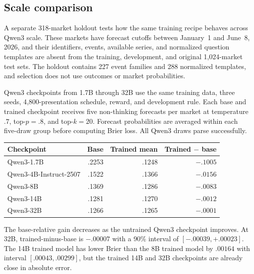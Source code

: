 \subsection{Scale comparison}
\label{app:exp4-scale}

A separate 318-market holdout tests how the same training recipe behaves across Qwen3 scale.
These markets have forecast cutoffs between January~1 and June~8, 2026, and their identifiers, events, available series, and normalized question templates are absent from the training, development, and original 1,024-market test sets.
The holdout contains 227 event families and 288 normalized templates, and selection does not use outcomes or market probabilities.

Qwen3 checkpoints from 1.7B through 32B use the same training data, three seeds, 4,800-presentation schedule, reward, and development rule.
Each base and trained checkpoint receives five non-thinking forecasts per market at temperature $.7$, top-\(p=.8\), and top-\(k=20\).
Forecast probabilities are averaged within each five-draw group before computing Brier loss.
All Qwen3 draws parse successfully.

\begin{center}
\begin{minipage}{0.82\linewidth}
\centering
{}
\label{tab:exp4-qwen-scale-results}
\small
\begin{tabular}{lrrr}
\toprule
Checkpoint & Base & Trained mean & Trained \(-\) base \\
\midrule
Qwen3-1.7B & .2253 & .1248 & $-.1005$ \\
Qwen3-4B-Instruct-2507 & .1522 & .1366 & $-.0156$ \\
Qwen3-8B & .1369 & .1286 & $-.0083$ \\
Qwen3-14B & .1281 & .1270 & $-.0012$ \\
Qwen3-32B & .1266 & .1265 & $-.0001$ \\
\bottomrule
\end{tabular}
\end{minipage}
\end{center}

The base-relative gain decreases as the untrained Qwen3 checkpoint improves.
At 32B, trained-minus-base is \(-.00007\) with a 90\% interval of \([-.00039,+.00023]\).
The 14B trained model has lower Brier than the 8B trained model by $.00164$ with interval \([.00043,.00299]\), but the trained 14B and 32B checkpoints are already close in absolute error.

